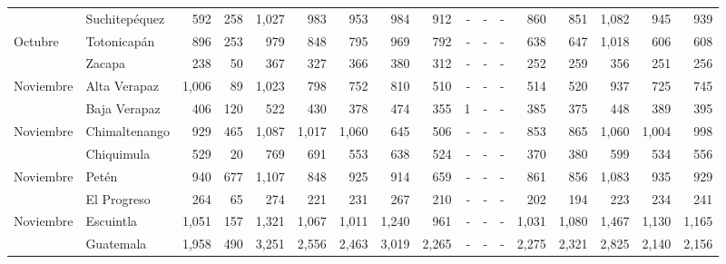 \begin{landscape}
\begin{center}
\begin{longtable}{llrrrrrrrrrrrrrrr}
			\rowcolor{color1!5!white}\multicolumn{1}{l}{	\footnotesize	 Octubre 	}&	 Suchitepéquez 	&	 592 	&	 258 	&	 1,027 	&	 983 	&	 953 	&	 984 	&	 912 	&	 -   	&	 -   	&	 -   	&	 860 	&	 851 	&	 1,082 	&	 945 	&	 939 	\\
			\multicolumn{1}{l}{	\footnotesize	 Octubre 	}&	 Totonicapán 	&	 896 	&	 253 	&	 979 	&	 848 	&	 795 	&	 969 	&	 792 	&	 -   	&	 -   	&	 -   	&	 638 	&	 647 	&	 1,018 	&	 606 	&	 608 	\\
			\rowcolor{color1!5!white}\multicolumn{1}{l}{	\footnotesize	 Octubre 	}&	 Zacapa 	&	 238 	&	 50 	&	 367 	&	 327 	&	 366 	&	 380 	&	 312 	&	 -   	&	 -   	&	 -   	&	 252 	&	 259 	&	 356 	&	 251 	&	 256 	\\
			\multicolumn{1}{l}{	\footnotesize	 Noviembre 	}&	 Alta Verapaz 	&	 1,006 	&	 89 	&	 1,023 	&	 798 	&	 752 	&	 810 	&	 510 	&	 -   	&	 -   	&	 -   	&	 514 	&	 520 	&	 937 	&	 725 	&	 745 	\\
			\rowcolor{color1!5!white}\multicolumn{1}{l}{	\footnotesize	 Noviembre 	}&	 Baja Verapaz 	&	 406 	&	 120 	&	 522 	&	 430 	&	 378 	&	 474 	&	 355 	&	 1 	&	 -   	&	 -   	&	 385 	&	 375 	&	 448 	&	 389 	&	 395 	\\
			\multicolumn{1}{l}{	\footnotesize	 Noviembre 	}&	 Chimaltenango 	&	 929 	&	 465 	&	 1,087 	&	 1,017 	&	 1,060 	&	 645 	&	 506 	&	 -   	&	 -   	&	 -   	&	 853 	&	 865 	&	 1,060 	&	 1,004 	&	 998 	\\
			\rowcolor{color1!5!white}\multicolumn{1}{l}{	\footnotesize	 Noviembre 	}&	 Chiquimula 	&	 529 	&	 20 	&	 769 	&	 691 	&	 553 	&	 638 	&	 524 	&	 -   	&	 -   	&	 -   	&	 370 	&	 380 	&	 599 	&	 534 	&	 556 	\\
			\multicolumn{1}{l}{	\footnotesize	 Noviembre 	}&	 Petén 	&	 940 	&	 677 	&	 1,107 	&	 848 	&	 925 	&	 914 	&	 659 	&	 -   	&	 -   	&	 -   	&	 861 	&	 856 	&	 1,083 	&	 935 	&	 929 	\\
			\rowcolor{color1!5!white}\multicolumn{1}{l}{	\footnotesize	 Noviembre 	}&	 El Progreso 	&	 264 	&	 65 	&	 274 	&	 221 	&	 231 	&	 267 	&	 210 	&	 -   	&	 -   	&	 -   	&	 202 	&	 194 	&	 223 	&	 234 	&	 241 	\\
			\multicolumn{1}{l}{	\footnotesize	 Noviembre 	}&	 Escuintla 	&	 1,051 	&	 157 	&	 1,321 	&	 1,067 	&	 1,011 	&	 1,240 	&	 961 	&	 -   	&	 -   	&	 -   	&	 1,031 	&	 1,080 	&	 1,467 	&	 1,130 	&	 1,165 	\\
			\rowcolor{color1!5!white}\multicolumn{1}{l}{	\footnotesize	 Noviembre 	}&	 Guatemala 	&	 1,958 	&	 490 	&	 3,251 	&	 2,556 	&	 2,463 	&	 3,019 	&	 2,265 	&	 -   	&	 -   	&	 -   	&	 2,275 	&	 2,321 	&	 2,825 	&	 2,140 	&	 2,156 	\\

\end{longtable}
\end{center}
\end{landscape}
